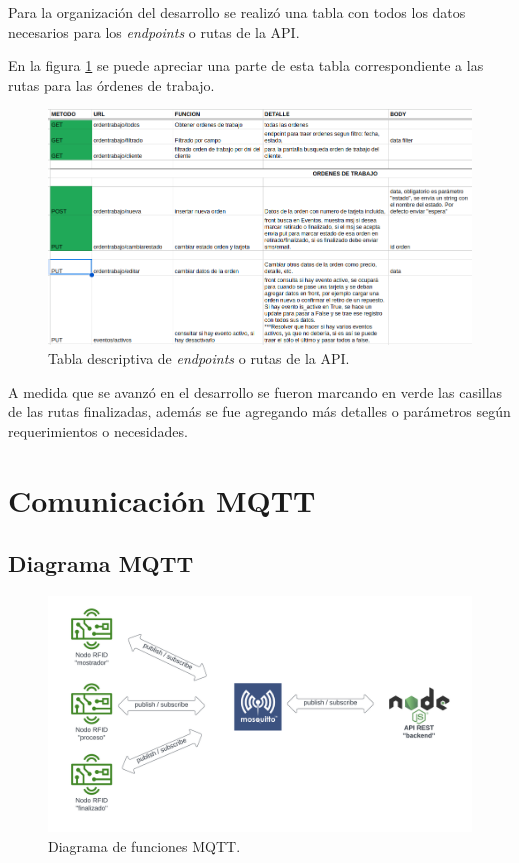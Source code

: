 Para la organización del desarrollo se realizó una tabla con todos los datos necesarios para los \textit{endpoints} o rutas de la API. 

En la figura \ref{fig:apiendpoints} se puede apreciar una parte de esta tabla correspondiente a las rutas para las órdenes de trabajo.

\begin{figure}[ht]
	\centering
	\includegraphics[scale=.40]{./Figures/api-endpoints.png}
	\caption{Tabla descriptiva de \textit{endpoints} o rutas de la API.}
	\label{fig:apiendpoints}
	
\end{figure}

A medida que se avanzó en el desarrollo se fueron marcando en verde las casillas de las rutas finalizadas, además se fue agregando más detalles o parámetros según requerimientos o necesidades.

\section{Comunicación MQTT}
\label{sec:mqttarquitectura}


\subsection{Diagrama MQTT}
\label{subsec:mqttdiagrama}

\begin{figure}[ht]
	\centering
	\includegraphics[scale=.15]{./Figures/mqtt-funciones.png}
	\caption{Diagrama de funciones MQTT.}
	\label{fig:mqttfunciones}
	
\end{figure}

